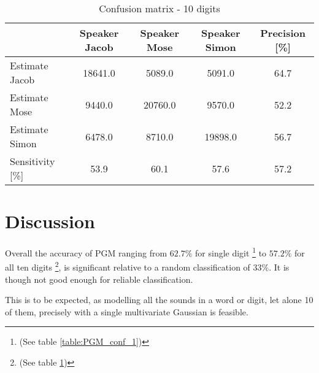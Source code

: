 \begin{table}[H]                                                    
\centering                                                          
\begin{tabular}{|l|c|c|c|c|}                                        
\hline                                                              
  & Speaker Jacob & Speaker Mose & Speaker Simon & Precision [\%] \\
\hline                                                              
Estimate Jacob & 18641.0 & 5089.0 & 5091.0 & 64.7 \\                
\hline                                                              
Estimate Mose & 9440.0 & 20760.0 & 9570.0 & 52.2 \\                 
\hline                                                              
Estimate Simon & 6478.0 & 8710.0 & 19898.0 & 56.7 \\                
\hline                                                              
Sensitivity [\%] & 53.9 & 60.1 & 57.6 & 57.2 \\                     
\hline                                                              
\end{tabular}                                                       
\caption{Confusion matrix - 10 digits}                              
\label{table:PGM_conf_10}                                           
\end{table}

\section{Discussion}
Overall the accuracy of PGM ranging from $ 62.7 \% $ for single digit 
\footnote{(See table \ref{table:PGM_conf_1})} 
to $ 57.2 \% $ for all ten digits
\footnote{(See table \ref{table:PGM_conf_10})}, is significant relative to a random classification of $ 33 \% $.
It is though not good enough for reliable classification. 

This is to be expected, as modelling all the sounds in a word or digit, let alone 10 of them, precisely with a single multivariate Gaussian is feasible.

 


